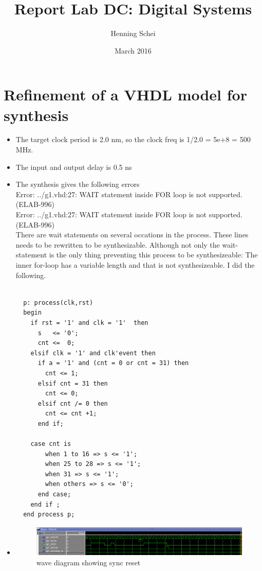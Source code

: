 \documentclass{article}
\title{Report Lab DC: Digital Systems}
\author{Henning Schei}
\date{March 2016}
\begin{document}
\maketitle


\section{Refinement of a VHDL model for synthesis}

\begin {itemize}
\item The target clock period is 2.0 nm, so the clock freq is 1/2.0 = 5e+8 = 500 MHz.
\item The input and output delay is 0.5 ns
\item The synthesis gives the following errors \\
Error:  ../g1.vhd:27: WAIT statement inside FOR loop is not supported. (ELAB-996)\\
Error:  ../g1.vhd:27: WAIT statement inside FOR loop is not supported. (ELAB-996)\\

There are wait statements on several occations in the process. These lines needs to be rewritten to be synthesizable. Although not only the wait-statement is the only thing preventing this process to be synthesizeable: The inner for-loop has a variable length and that is not synthesizeable. I did the following.


\begin{lstlisting}

  p: process(clk,rst)
  begin
    if rst = '1' and clk = '1'  then
      s   <= '0';
      cnt <=  0;
    elsif clk = '1' and clk'event then
      if a = '1' and (cnt = 0 or cnt = 31) then
        cnt <= 1;
      elsif cnt = 31 then
        cnt <= 0;
      elsif cnt /= 0 then
        cnt <= cnt +1;
      end if;

    case cnt is
        when 1 to 16 => s <= '1';
        when 25 to 28 => s <= '1';
        when 31 => s <= '1';
        when others => s <= '0';
      end case;
    end if ;
  end process p;
\end{lstlisting}

\item 
\begin{figure}[H]
\begin {center}
\includegraphics[scale=0.4]{syncrst.png}
\caption{wave diagram showing sync reset}
\end{center}
\end{figure}








\end {itemize}
\end{document}
